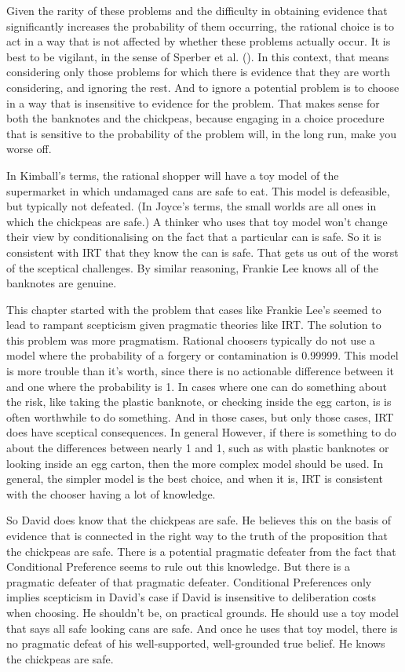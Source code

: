 \documentclass[
  12pt,
  letterpaper,
]{scrbook}
\begin{document}
Given the rarity of these problems and the difficulty in obtaining
evidence that significantly increases the probability of them occurring,
the rational choice is to act in a way that is not affected by whether
these problems actually occur. It is best to be vigilant, in the sense
of Sperber et al. (). In this
context, that means considering only those problems for which there is
evidence that they are worth considering, and ignoring the rest. And to
ignore a potential problem is to choose in a way that is insensitive to
evidence for the problem. That makes sense for both the banknotes and
the chickpeas, because engaging in a choice procedure that is sensitive
to the probability of the problem will, in the long run, make you worse
off.

In Kimball's terms, the rational shopper will have a toy model of the
supermarket in which undamaged cans are safe to eat. This model is
defeasible, but typically not defeated. (In Joyce's terms, the small
worlds are all ones in which the chickpeas are safe.) A thinker who uses
that toy model won't change their view by conditionalising on the fact
that a particular can is safe. So it is consistent with IRT that they
know the can is safe. That gets us out of the worst of the sceptical
challenges. By similar reasoning, Frankie Lee knows all of the banknotes
are genuine.

This chapter started with the problem that cases like Frankie Lee's
seemed to lead to rampant scepticism given pragmatic theories like IRT.
The solution to this problem was more pragmatism. Rational choosers
typically do not use a model where the probability of a forgery or
contamination is 0.99999. This model is more trouble than it's worth,
since there is no actionable difference between it and one where the
probability is 1. In cases where one can do something about the risk,
like taking the plastic banknote, or checking inside the egg carton, is
is often worthwhile to do something. And in those cases, but only those
cases, IRT does have sceptical consequences. In general However, if
there is something to do about the differences between nearly 1 and 1,
such as with plastic banknotes or looking inside an egg carton, then the
more complex model should be used. In general, the simpler model is the
best choice, and when it is, IRT is consistent with the chooser having a
lot of knowledge.

So David does know that the chickpeas are safe. He believes this on the
basis of evidence that is connected in the right way to the truth of the
proposition that the chickpeas are safe. There is a potential pragmatic
defeater from the fact that Conditional Preference seems to rule out
this knowledge. But there is a pragmatic defeater of that pragmatic
defeater. Conditional Preferences only implies scepticism in David's
case if David is insensitive to deliberation costs when choosing. He
shouldn't be, on practical grounds. He should use a toy model that says
all safe looking cans are safe. And once he uses that toy model, there
is no pragmatic defeat of his well-supported, well-grounded true belief.
He knows the chickpeas are safe.
\end{document}
